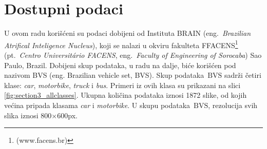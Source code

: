 \documentclass[12pt,oneside]{memoir}
\newcommand{\bvs}{\ensuremath{\,\textrm{BVS}}}
\begin{document}
\section{Dostupni podaci}

U ovom radu korišćeni su podaci dobijeni od Instituta BRAIN (eng.~\textit{Brazilian Atrifical Inteligence Nucleus}), koji se nalazi u okviru fakulteta FFACENS\footnote{(www.facens.br)} (pt.~\textit{Centro Universitário FACENS}, eng.~\textit{Faculty of Engineering of Sorocaba}) Sao Paulo, Brazil. Dobijeni skup podataka, u radu na dalje, biće korišćen pod nazivom BVS (eng. Brazilian vehicle set, BVS).
Skup podataka \bvs{} sadrži četiri klase: \textit{car}, \textit{motorbike}, \textit{truck} i \textit{bus}. Primeri iz ovih klasa su prikazani na slici \ref{fig:section3_allclasses}. Ukupna količina podataka iznosi 1872 slike, od kojih većina pripada klasama \textit{car} i \textit{motorbike}. U skupu podataka \bvs, rezolucija svih slika iznosi 800$\times$600px. 
\end{document}
